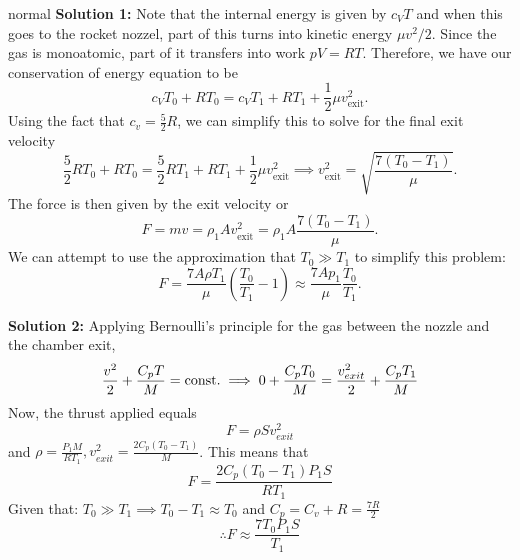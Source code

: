 \begin{solution}{normal}
\textbf{Solution 1:} Note that the internal energy is given by $c_V T$ and when this goes to the rocket nozzel, part of this turns into kinetic energy $\mu v^2/2$. Since the gas is monoatomic, part of it transfers into work $pV = RT$. Therefore, we have our conservation of energy equation to be 
\[c_V T_0 + RT_0 = c_V T_1 + RT_1 + \frac{1}{2}\mu v_{\text{exit}}^2.\]
Using the fact that $c_v = \frac{5}{2}R$, we can simplify this to solve for the final exit velocity
\[\frac{5}{2}RT_0 + RT_0 = \frac{5}{2}RT_1 + RT_1 + \frac{1}{2}\mu v_{\text{exit}}^2\implies v_{\text{exit}}^2 = \sqrt{\frac{7 (T_0 - T_1)}{\mu}}.\]
The force is then given by the exit velocity or 
\[F = mv = \rho_1 A v_{\text{exit}}^2 = \rho_1 A \frac{7 (T_0 - T_1)}{\mu}.\]
We can attempt to use the approximation that $T_0 \gg T_1$ to simplify this problem:
\[F = \frac{7A\rho T_1}{\mu} \left(\frac{T_0}{T_1} - 1\right)\approx \frac{7Ap_1}{\mu}\frac{T_0}{T_1}.\]

\tcbline 

\textbf{Solution 2:} Applying Bernoulli's principle for the gas between the nozzle and the chamber exit,
$$\frac{v^2}{2}+\frac{C_p T}{M}=\textup{const.}\implies 0+\frac{C_p T_0}{M}=\frac{v_{exit}^2}{2}+\frac{C_p T_1}{M}$$
Now, the thrust applied equals
$$F=\rho S v_{exit}^2$$
and $\rho = \frac{P_1 M}{RT_1}, v_{exit}^2=\frac{2C_p (T_0-T_1)}{M}$. This means that 
$$F=\frac{2C_p(T_0-T_1)P_1 S}{RT_1}$$
Given that: $T_0 \gg T_1 \implies T_0-T_1 \approx T_0$ and $C_p =C_v+R=\frac{7R}{2}$
$$\therefore F\approx \frac{7T_0P_1 S}{T_1} $$

\end{solution}